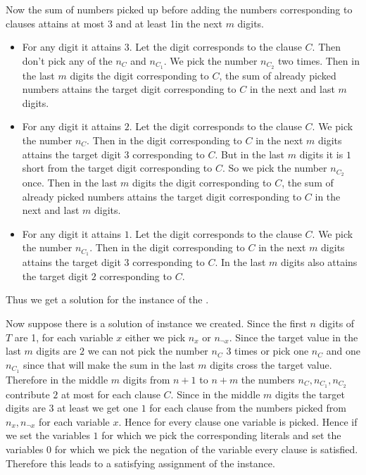 \documentclass[a4paper, 11pt]{article}
\begin{document}
{	Now  the sum of numbers picked up before adding the numbers corresponding to clauses attains at most 3 and at least 1in the next $m$ digits. \begin{itemize}
		\item For any digit it attains $3$. Let the digit corresponds to the clause $C$. Then don't pick any of the $n_C$ and $n_{C_1}$. We pick the number $n_{C_2}$ two times. Then in the last $m$ digits the digit corresponding to $C$,  the sum of already picked numbers attains the target digit corresponding to $C$ in the next and last $m$ digits.
		\item For any digit it attains $2$. Let the digit corresponds to the clause $C$. We pick the number $n_{C}$. Then in the digit corresponding to $C$ in the next $m$ digits attains the target digit $3$ corresponding to $C$. But in the last $m$ digits it is $1$ short from the target digit corresponding to $C$. So we pick the number $n_{C_2}$ once. Then in the last $m$ digits the digit corresponding to $C$,  the sum of already picked numbers attains the target digit corresponding to $C$ in the next and last $m$ digits.
		\item For any digit it attains $1$. Let the digit corresponds to the clause $C$. We pick the number $n_{C_1}$. Then in the digit corresponding to $C$ in the next $m$ digits attains the target digit $3$ corresponding to $C$. In the last $m$ digits also attains the target digit $2$ corresponding to $C$. 
	\end{itemize}Thus we get a solution for the instance of the .

Now suppose there is a solution of  instance we created. Since  the first $n$ digits of $T$ are 1, for each variable $x$ either we pick $n_x$ or $n_{\neg x}$. Since the target value in the last $m$ digits are $2$ we can not pick the number $n_{C}$ 3 times or pick one $n_{C}$ and one $n_{C_1}$ since that will make the sum in the last $m$ digits cross the target value. Therefore in the middle $m$ digits from $n+1$ to $n+m$ the numbers $n_C,n_{C_1}, n_{C_2}$ contribute $2$ at most for each clause $C$. Since in the middle $m$ digits the target digits are $3$ at least we get one $1$ for each clause from the numbers picked from $n_{x},n_{\neg x}$  for each variable $x$. Hence for every clause one variable is picked. Hence if we set the variables $1$ for which we pick the corresponding literals  and set the variables $0$ for which we pick the negation of the variable  every clause is satisfied. Therefore this leads to a satisfying assignment of the  instance. 

}
\end{document}
